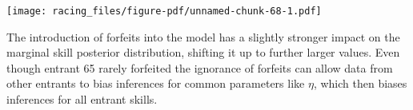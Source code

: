 \documentclass[
  letterpaper,
  DIV=11,
  numbers=noendperiod]{scrartcl}
\newenvironment{Shaded}{\begin{snugshade}}{\end{snugshade}}
\newcommand{\AttributeTok}[1]{\textcolor[rgb]{0.40,0.45,0.13}{#1}}
\newcommand{\ConstantTok}[1]{\textcolor[rgb]{0.56,0.35,0.01}{#1}}
\newcommand{\DecValTok}[1]{\textcolor[rgb]{0.68,0.00,0.00}{#1}}
\newcommand{\FloatTok}[1]{\textcolor[rgb]{0.68,0.00,0.00}{#1}}
\newcommand{\FunctionTok}[1]{\textcolor[rgb]{0.28,0.35,0.67}{#1}}
\newcommand{\NormalTok}[1]{\textcolor[rgb]{0.00,0.23,0.31}{#1}}
\newcommand{\SpecialCharTok}[1]{\textcolor[rgb]{0.37,0.37,0.37}{#1}}
\newcommand{\StringTok}[1]{\textcolor[rgb]{0.13,0.47,0.30}{#1}}
\begin{document}
\begin{Shaded}
\end{Shaded}

\texttt{[image: racing\_files/figure-pdf/unnamed-chunk-68-1.pdf]}

The introduction of forfeits into the model has a slightly stronger
impact on the marginal skill posterior distribution, shifting it up to
further larger values. Even though entrant 65 rarely forfeited the
ignorance of forfeits can allow data from other entrants to bias
inferences for common parameters like \(\eta\), which then biases
inferences for all entrant skills.
\end{document}
